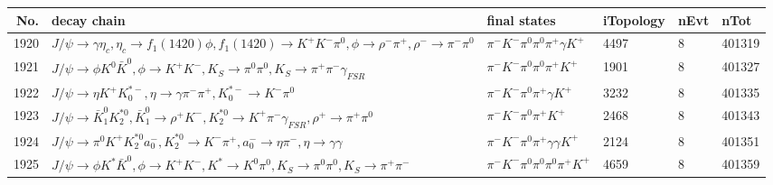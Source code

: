 \begin{table}[htbp] 
\begin{center}
\begin{small}
\begin{tabular}{rlllll}\hline\hline
 No. & decay chain & final states &  iTopology & nEvt & nTot \\\hline
1920&$J/\psi       \rightarrow \gamma       \eta_{c}    , \eta_{c}     \rightarrow f_{1}(1420)    \phi           , f_{1}(1420)     \rightarrow K^{+}          K^{-}          \pi^{0}        , \phi            \rightarrow \rho^{-}      \pi^{+}        , \rho^{-}       \rightarrow \pi^{-}        \pi^{0}        $&$\pi^{-}        K^{-}          \pi^{0}        \pi^{0}        \pi^{+}        \gamma       K^{+}          $& 4497&    8&401319\\
1921&$J/\psi       \rightarrow \phi           K^{0}          \bar{K}^{0}   , \phi            \rightarrow K^{+}          K^{-}          , K_{S}           \rightarrow \pi^{0}        \pi^{0}        , K_{S}           \rightarrow \pi^{+}        \pi^{-}        \gamma_{FSR} $&$\pi^{-}        K^{-}          \pi^{0}        \pi^{0}        \pi^{+}        K^{+}          $& 1901&    8&401327\\
1922&$J/\psi       \rightarrow \eta          K^{+}          K_{0}^{*-}     , \eta           \rightarrow \gamma       \pi^{-}        \pi^{+}        , K_{0}^{*-}      \rightarrow K^{-}          \pi^{0}        $&$\pi^{-}        K^{-}          \pi^{0}        \pi^{+}        \gamma       K^{+}          $& 3232&    8&401335\\
1923&$J/\psi       \rightarrow \bar{K}_1^{0} K_2^{*0}       , \bar{K}_1^{0}  \rightarrow \rho^{+}      K^{-}          , K_2^{*0}        \rightarrow K^{+}          \pi^{-}        \gamma_{FSR} , \rho^{+}       \rightarrow \pi^{+}        \pi^{0}        $&$\pi^{-}        K^{-}          \pi^{0}        \pi^{+}        K^{+}          $& 2468&    8&401343\\
1924&$J/\psi       \rightarrow \pi^{0}        K^{+}          K_2^{*0}       a_{0}^{-}      , K_2^{*0}        \rightarrow K^{-}          \pi^{+}        , a_{0}^{-}       \rightarrow \eta          \pi^{-}        , \eta           \rightarrow \gamma       \gamma       $&$\pi^{-}        K^{-}          \pi^{0}        \pi^{+}        \gamma       \gamma       K^{+}          $& 2124&    8&401351\\
1925&$J/\psi       \rightarrow \phi           K^{*}          \bar{K}^{0}   , \phi            \rightarrow K^{+}          K^{-}          , K^{*}           \rightarrow K^{0}          \pi^{0}        , K_{S}           \rightarrow \pi^{0}        \pi^{0}        , K_{S}           \rightarrow \pi^{+}        \pi^{-}        $&$\pi^{-}        K^{-}          \pi^{0}        \pi^{0}        \pi^{0}        \pi^{+}        K^{+}          $& 4659&    8&401359\\

\end{tabular}
\end{small}
\end{center}
\end{table}
